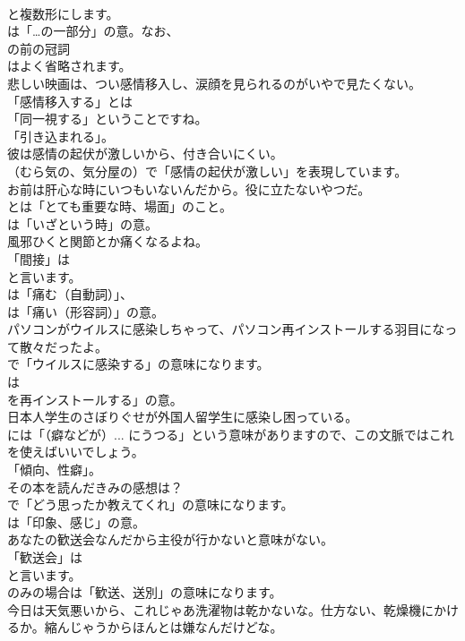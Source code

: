 \documentclass[8pt]{extreport}
\begin{document}
\begin{CJK}{UTF8}{min}
\\	と複数形にします。
\\	は「…の一部分」の意。なお、
\\	の前の冠詞
\\	はよく省略されます。	
\\	悲しい映画は、つい感情移入し、涙顔を見られるのがいやで見たくない。 
\\	「感情移入する」とは
\\	「同一視する」ということですね。
\\	「引き込まれる」。	
\\	彼は感情の起伏が激しいから、付き合いにくい。 
\\	（むら気の、気分屋の）で「感情の起伏が激しい」を表現しています。	
\\	お前は肝心な時にいつもいないんだから。役に立たないやつだ。 
\\	とは「とても重要な時、場面」のこと。
\\	は「いざという時」の意。	
\\	風邪ひくと関節とか痛くなるよね。 
\\	「間接」は
\\	と言います。
\\	は「痛む（自動詞）」、
\\	は「痛い（形容詞）」の意。	
\\	パソコンがウイルスに感染しちゃって、パソコン再インストールする羽目になって散々だったよ。 
\\	で「ウイルスに感染する」の意味になります。
\\	は
\\	を再インストールする」の意。	
\\	日本人学生のさぼりぐせが外国人留学生に感染し困っている。 
\\	には「（癖などが）... にうつる」という意味がありますので、この文脈ではこれを使えばいいでしょう。
\\	「傾向、性癖」。	
\\	その本を読んだきみの感想は？ 
\\	で「どう思ったか教えてくれ」の意味になります。
\\	は「印象、感じ」の意。	
\\	あなたの歓送会なんだから主役が行かないと意味がない。 
\\	「歓送会」は
\\	と言います。
\\	のみの場合は「歓送、送別」の意味になります。	
\\	今日は天気悪いから、これじゃあ洗濯物は乾かないな。仕方ない、乾燥機にかけるか。縮んじゃうからほんとは嫌なんだけどな。 

\end{CJK}
\end{document}
